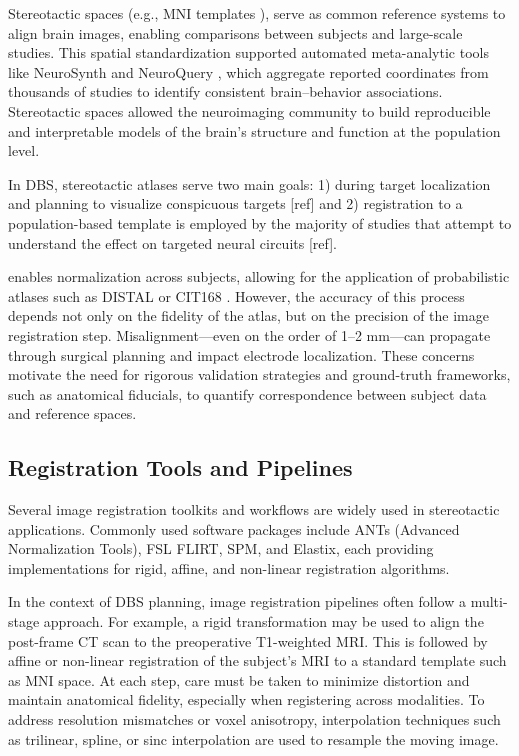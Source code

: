 Stereotactic spaces (e.g., MNI templates \cite{Avants2008-ek,Fonov2009-oi}), serve as common reference systems to align brain images, enabling comparisons between subjects and large-scale studies. This spatial standardization supported automated meta-analytic tools like NeuroSynth \cite{Yarkoni2011-sr} and NeuroQuery \cite{Dockes2020-nw}, which aggregate reported coordinates from thousands of studies to identify consistent brain–behavior associations. Stereotactic spaces allowed the neuroimaging community to build reproducible and interpretable models of the brain's structure and function at the population level.

In DBS, stereotactic atlases serve two main goals: 1) during target localization and planning to visualize conspicuous targets [ref] and 2) registration to a population-based template is employed by the majority of studies that attempt to understand the effect on targeted neural circuits [ref]. 

enables normalization across subjects, allowing for the application of probabilistic atlases such as DISTAL \cite{Ewert2018} or CIT168 \cite{Pauli2018}. However, the accuracy of this process depends not only on the fidelity of the atlas, but on the precision of the image registration step. Misalignment—even on the order of 1–2 mm—can propagate through surgical planning and impact electrode localization. These concerns motivate the need for rigorous validation strategies and ground-truth frameworks, such as anatomical fiducials, to quantify correspondence between subject data and reference spaces.

\subsection{Registration Tools and Pipelines}
Several image registration toolkits and workflows are widely used in stereotactic applications. Commonly used software packages include ANTs (Advanced Normalization Tools), FSL FLIRT, SPM, and Elastix, each providing implementations for rigid, affine, and non-linear registration algorithms.

In the context of DBS planning, image registration pipelines often follow a multi-stage approach. For example, a rigid transformation may be used to align the post-frame CT scan to the preoperative T1-weighted MRI. This is followed by affine or non-linear registration of the subject's MRI to a standard template such as MNI space. At each step, care must be taken to minimize distortion and maintain anatomical fidelity, especially when registering across modalities. To address resolution mismatches or voxel anisotropy, interpolation techniques such as trilinear, spline, or sinc interpolation are used to resample the moving image.


